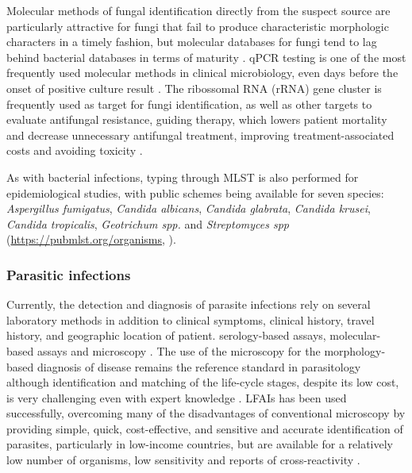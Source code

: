 Molecular methods of fungal identification directly from the suspect source are particularly attractive for fungi that fail to produce characteristic morphologic characters in a timely fashion, but molecular databases for fungi tend to lag behind bacterial databases in terms of maturity \citep{ramanan_laboratory_2017}. qPCR testing  is one of the most frequently used
molecular methods in clinical microbiology, even days before the onset of positive culture result \citep{kourkoumpetis_polymerase_2012}. The ribossomal RNA (rRNA) gene cluster is frequently used as target for fungi identification, as well as other targets to evaluate antifungal resistance, guiding therapy, which lowers patient mortality and decrease unnecessary antifungal treatment, improving treatment-associated costs and avoiding toxicity \citep{kourkoumpetis_polymerase_2012}. 

As with bacterial infections, typing through MLST is also performed for epidemiological studies, with public schemes being available for seven species: \textit{Aspergillus fumigatus}, \textit{Candida albicans}, \textit{Candida glabrata}, \textit{Candida krusei}, \textit{Candida tropicalis}, \textit{Geotrichum spp.} and \textit{Streptomyces spp} (\url{https://pubmlst.org/organisms}, \cite{jolley_open-access_2018}).

\subsubsection{Parasitic infections} \label{sssec:parasites}

Currently, the detection and diagnosis of parasite infections rely on several laboratory methods in addition to clinical symptoms, clinical history, travel history, and geographic location of patient. serology-based assays, molecular-based assays and microscopy  \citep{ndao_diagnosis_2009}. The use of the microscopy for the morphology-based diagnosis of disease remains the reference standard in parasitology although identification and matching of the life-cycle stages, despite its low cost, is very challenging even with expert knowledge \citep{blasco-costa_molecular_2016}. LFAIs has been used successfully, overcoming many of the disadvantages of conventional microscopy by providing simple, quick, cost-effective, and sensitive and accurate identification of parasites, particularly in low-income countries, but are available for a relatively low number of organisms, low sensitivity and reports of cross-reactivity \citep{momcilovic_rapid_2019, robert-gangneux_epidemiology_2012, rajput_false_2018}. 

